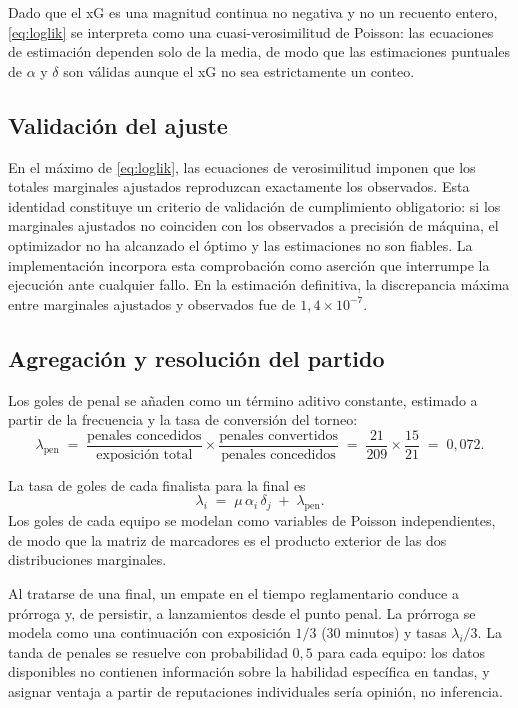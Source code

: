 \documentclass[11pt,a4paper]{article}
\begin{document}
Dado que el xG es una magnitud continua no negativa y no un recuento entero, \eqref{eq:loglik} se interpreta como una cuasi-verosimilitud de Poisson: las ecuaciones de estimación dependen solo de la media, de modo que las estimaciones puntuales de $\alpha$ y $\delta$ son válidas aunque el xG no sea estrictamente un conteo.

\subsection{Validación del ajuste}

En el máximo de \eqref{eq:loglik}, las ecuaciones de verosimilitud imponen que los totales marginales ajustados reproduzcan exactamente los observados. Esta identidad constituye un criterio de validación de cumplimiento obligatorio: si los marginales ajustados no coinciden con los observados a precisión de máquina, el optimizador no ha alcanzado el óptimo y las estimaciones no son fiables. La implementación incorpora esta comprobación como aserción que interrumpe la ejecución ante cualquier fallo. En la estimación definitiva, la discrepancia máxima entre marginales ajustados y observados fue de $1{,}4\times 10^{-7}$.

\subsection{Agregación y resolución del partido}
\label{sec:agregacion}

Los goles de penal se añaden como un término aditivo constante, estimado a partir de la frecuencia y la tasa de conversión del torneo:
\begin{equation}
\lambda_{\text{pen}} \;=\; \frac{\text{penales concedidos}}{\text{exposición total}} \times \frac{\text{penales convertidos}}{\text{penales concedidos}} \;=\; \frac{21}{209} \times \frac{15}{21} \;=\; 0{,}072.
\end{equation}

La tasa de goles de cada finalista para la final es
\begin{equation}
\lambda_i \;=\; \mu\, \alpha_i\, \delta_j \;+\; \lambda_{\text{pen}}.
\end{equation}
Los goles de cada equipo se modelan como variables de Poisson independientes, de modo que la matriz de marcadores es el producto exterior de las dos distribuciones marginales.

Al tratarse de una final, un empate en el tiempo reglamentario conduce a prórroga y, de persistir, a lanzamientos desde el punto penal. La prórroga se modela como una continuación con exposición $1/3$ (30 minutos) y tasas $\lambda_i/3$. La tanda de penales se resuelve con probabilidad $0{,}5$ para cada equipo: los datos disponibles no contienen información sobre la habilidad específica en tandas, y asignar ventaja a partir de reputaciones individuales sería opinión, no inferencia.
\end{document}
